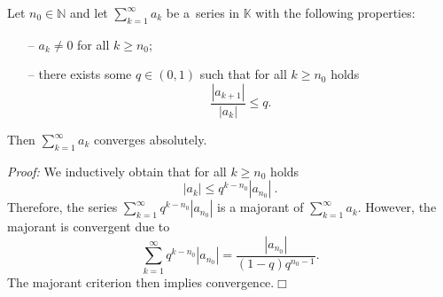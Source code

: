 

\begin{Theorem}
\label{thm:quotkrit}
Let $n_0\in\mathbb{N}$ and let $\sum_{k=1}^\infty a_k$ be a~series in $\mathbb{K}$ with the following properties:
\begin{itemize}
 \item[--] $a_k\neq0$ for all $k\geq n_0$;
 \item[--] there exists some $q\in(0,1)$ such that for all $k\geq n_0$ holds
\[\frac{|a_{k+1}|}{|a_{k}|}\leq q.\]
\end{itemize}
Then $\sum_{k=1}^\infty a_k$ converges absolutely.
\end{Theorem}
%
{\em Proof:} We inductively obtain that for all $k\geq n_0$ holds
\[|a_k|\leq q^{k-n_0}|a_{n_0}| \ .\]
Therefore, the series $\sum_{k=1}^\infty q^{k-n_0}|a_{n_0}|$ is a majorant of $\sum_{k=1}^\infty a_k$. However, the majorant is convergent due to
\[\sum_{k=1}^\infty q^{k-n_0}|a_{n_0}|=\frac{|a_{n_0}|}{(1-q)q^{n_0-1}}.\]
The majorant criterion then implies convergence.$\Box$

